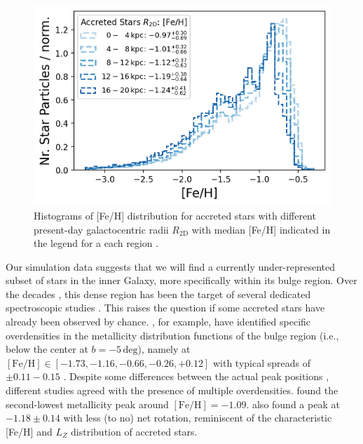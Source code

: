 \documentclass[fleqn,usenatbib]{mnras}
\begin{document}
\begin{figure}
    \centering
    \includegraphics[width=\columnwidth]{figures/fe_h_histograms_r_bins.png}
    \caption{Histograms of {[Fe/H]} distribution for accreted stars with different present-day galactocentric radii $R_\mathrm{2D}$ with median {[Fe/H]} indicated in the legend for a each region \href{https://github.com/svenbuder/golden_thread_I/tree/main/figures}{\faGithub}.}
    \label{fig:fe_h_histograms_r_bins}
\end{figure}

Our simulation data suggests that we will find a currently under-represented subset of stars in the inner Galaxy, more specifically within its bulge region. Over the decades \citep[see for example][for a review]{Barbuy2018}, this dense region has been the target of several dedicated spectroscopic studies \citep[for example][]{Ness2013, Bensby2017, Lucey2019}. This raises the question if some accreted stars have already been observed by chance. \citet{Ness2013, Ness2013b}, for example, have identified specific overdensities in the metallicity distribution functions of the bulge region (i.e., below the center at $b = -5\,\mathrm{deg}$), namely at $\mathrm{[Fe/H]} \in [-1.73, -1.16, -0.66, -0.26, +0.12]$ with typical spreads of $\pm0.11-0.15$ \citep[see also][]{Portail2017}. Despite some differences between the actual peak positions \citep[compare for example Fig.~4 by][]{Barbuy2018}, different studies agreed with the presence of multiple overdensities. \citet{Bensby2017} found the second-lowest metallicity peak around $\mathrm{[Fe/H]} = -1.09$. \citet{Portail2017} also found a peak at $-1.18\pm 0.14$ with less (to no) net rotation, reminiscent of the characteristic [Fe/H] and $L_Z$ distribution of accreted stars. 
\end{document}
